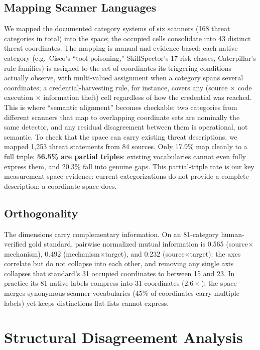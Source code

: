 \documentclass[sigconf,nonacm]{acmart}
\begin{document}
\subsection{Mapping Scanner Languages}
We mapped the documented category systems of six scanners (168 threat categories in total) into the space; the occupied cells consolidate into 43 distinct threat coordinates. The mapping is manual and evidence-based: each native category (e.g.\ Cisco's ``tool poisoning,'' SkillSpector's 17 risk classes, Caterpillar's rule families) is assigned to the set of coordinates its triggering conditions actually observe, with multi-valued assignment when a category spans several coordinates; a credential-harvesting rule, for instance, covers any (source $\times$ code execution $\times$ information theft) cell regardless of how the credential was reached. This is where ``semantic alignment'' becomes checkable: two categories from different scanners that map to overlapping coordinate sets are nominally the same detector, and any residual disagreement between them is operational, not semantic. To check that the space can carry existing threat descriptions, we mapped 1{,}253 threat statements from 84 sources. Only 17.9\% map cleanly to a full triple; \textbf{56.5\% are partial triples}: existing vocabularies cannot even fully express them, and 20.3\% fall into genuine gaps. This partial-triple rate is our key measurement-space evidence: current categorizations do not provide a complete description; a coordinate space does.

\subsection{Orthogonality}
The dimensions carry complementary information. On an 81-category human-verified gold standard, pairwise normalized mutual information is 0.565 (source$\times$mechanism), 0.492 (mechanism$\times$target), and 0.232 (source$\times$target): the axes correlate but do not collapse into each other, and removing any single axis collapses that standard's 31 occupied coordinates to between 15 and 23. In practice its 81 native labels compress into 31 coordinates ($2.6\times$): the space merges synonymous scanner vocabularies (45\% of coordinates carry multiple labels) yet keeps distinctions flat lists cannot express.

\section{Structural Disagreement Analysis}
\label{sec:explain}
\end{document}

